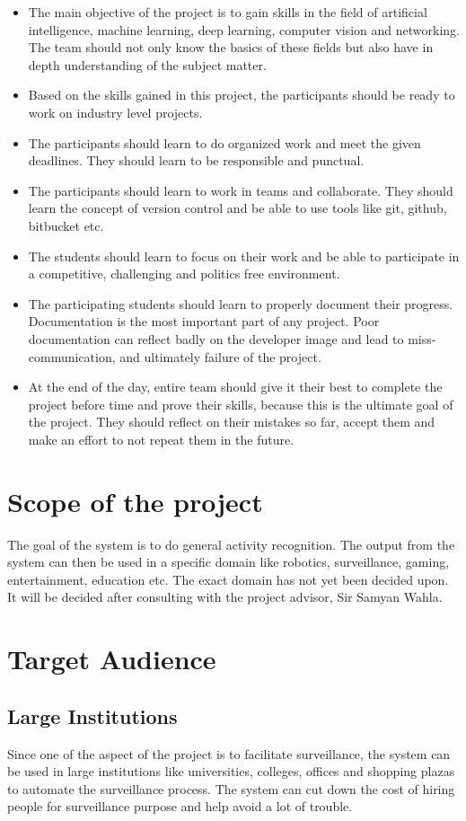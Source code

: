 \documentclass[11pt]{article}
\begin{document}
\begin{itemize}
	\item The main objective of the project is to gain skills in the field of artificial intelligence, machine learning, deep learning, computer vision and networking. The team should not only know the basics of these fields but also have in depth understanding of the subject matter. 
	\item Based on the skills gained in this project, the participants should be ready to work on industry level projects. 
	\item The participants should learn to do organized work and meet the given deadlines. They should learn to be responsible and punctual. 
	\item The participants should learn to work in teams and collaborate. They should learn the concept of version control and be able to use tools like git, github, bitbucket etc. 
	\item The students should learn to focus on their work and be able to participate in a competitive, challenging and politics free environment.
	\item The participating students should learn to properly document their progress. Documentation is the most important part of any project. Poor documentation can reflect badly on the developer image and lead to miss-communication, and ultimately failure of the project. 
	\item At the end of the day, entire team should give it their best to complete the project before time and prove their skills, because this is the ultimate goal of the project. They should reflect on their mistakes so far, accept them and make an effort to not repeat them in the future. 
\end{itemize}

\section{\textbf{Scope of the project}}	
 The goal of the system is to do general activity recognition. The output from the system can then be used in a specific domain like robotics, surveillance, gaming, entertainment, education etc. The exact domain has not yet been decided upon. It will be decided after consulting with the project advisor, Sir Samyan Wahla. 
\section{\textbf{Target Audience}}
\subsection{\textbf{Large Institutions}}
Since one of the aspect of the project is to facilitate surveillance, the system can be used in large institutions like universities, colleges, offices and shopping plazas to automate the surveillance process. The system can cut down the cost of hiring people for surveillance purpose and help avoid a lot of trouble. 
\end{document}
